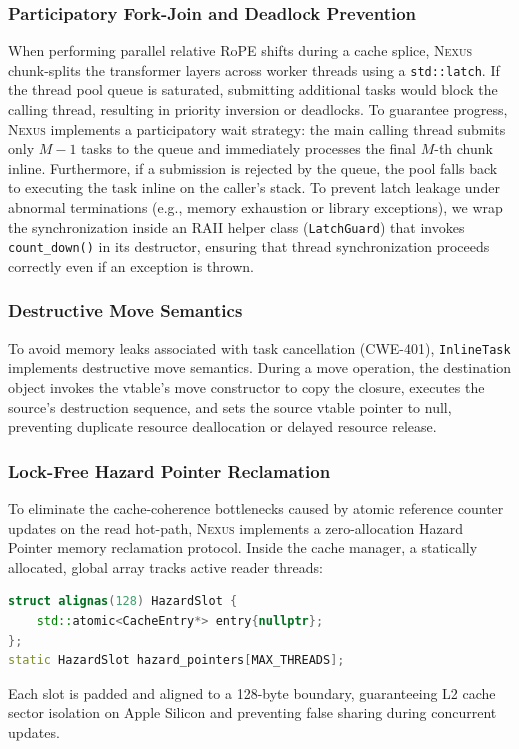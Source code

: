 \documentclass[conference,10pt]{IEEEtran}
\newcommand{\Nexus}{\textsc{Nexus}\xspace}
\begin{document}
\subsubsection{Participatory Fork-Join and Deadlock Prevention}
When performing parallel relative RoPE shifts during a cache splice, \Nexus chunk-splits the transformer layers across worker threads using a \texttt{std::latch}. If the thread pool queue is saturated, submitting additional tasks would block the calling thread, resulting in priority inversion or deadlocks. To guarantee progress, \Nexus implements a participatory wait strategy: the main calling thread submits only $M-1$ tasks to the queue and immediately processes the final $M$-th chunk inline. Furthermore, if a submission is rejected by the queue, the pool falls back to executing the task inline on the caller's stack. To prevent latch leakage under abnormal terminations (e.g., memory exhaustion or library exceptions), we wrap the synchronization inside an RAII helper class (\texttt{LatchGuard}) that invokes \texttt{count\_down()} in its destructor, ensuring that thread synchronization proceeds correctly even if an exception is thrown.

\subsubsection{Destructive Move Semantics}
To avoid memory leaks associated with task cancellation (CWE-401), \texttt{InlineTask} implements destructive move semantics. During a move operation, the destination object invokes the vtable's move constructor to copy the closure, executes the source's destruction sequence, and sets the source vtable pointer to null, preventing duplicate resource deallocation or delayed resource release.

\subsubsection{Lock-Free Hazard Pointer Reclamation}
To eliminate the cache-coherence bottlenecks caused by atomic reference counter updates on the read hot-path, \Nexus implements a zero-allocation Hazard Pointer memory reclamation protocol. Inside the cache manager, a statically allocated, global array tracks active reader threads:
\begin{lstlisting}[language=C++, basicstyle=\ttfamily\footnotesize, breaklines=true]
struct alignas(128) HazardSlot {
    std::atomic<CacheEntry*> entry{nullptr};
};
static HazardSlot hazard_pointers[MAX_THREADS];
\end{lstlisting}
Each slot is padded and aligned to a 128-byte boundary, guaranteeing L2 cache sector isolation on Apple Silicon and preventing false sharing during concurrent updates.
\end{document}
